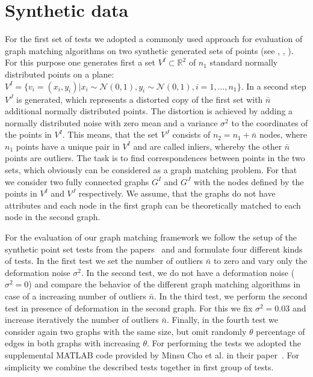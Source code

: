 \section{Synthetic data}
For the first set of tests we adopted a commonly used approach for evaluation of graph matching algorithms on two synthetic generated sets of points (see \cite{Cho2014_Haystack}, \cite{Cho2010_RRWM}, \cite{Leordeanu2009_IPFP}). 
For this purpose one generates first a set $V^I\subset\mathbb{R}^2$ of $n_1$ standard normally distributed points on a plane: $V^I=\{v_i=(x_i,y_i)|x_i\sim\mathcal{N}(0,1),y_i\sim\mathcal{N}(0,1),i=1,\dots,n_1\}$. In a second step $V^J$ is generated, which represents a distorted copy of the first set with $\bar{n}$ additional normally distributed points. The distortion is achieved by adding a normally distributed noise with zero mean and a variance $\sigma^2$ to the coordinates of the points in $V^I$. 
This means, that the set $V^J$ consists of $n_2=n_1+\bar{n}$ nodes, where $n_1$ points have a unique pair in $V^I$ and are called inliers, whereby the other $\bar{n}$ points are outliers. The task is to find correspondences between points in the two sets, which obviously can be considered as a graph matching problem. For that we consider two fully connected graphs $G^I$ and $G^J$ with the nodes defined by the points in $V^I$ and $V^J$ respectively. We assume, that the graphs do not have attributes and each node in the first graph can be theoretically matched to each node in the second graph.

For the evaluation of our graph matching framework we follow the setup of the synthetic point set tests from the papers~\cite{Cho2014_Haystack} and \cite{FastPFP} and formulate four different kinds of tests. In the first test we set the number of outliers $\bar{n}$ to zero and vary only the deformation noise $\sigma^2$. In the second test, we do not have a deformation noise ($\sigma^2=0$) and compare the behavior of the different graph matching algorithms in case of a increasing number of outliers $\bar{n}$. In the third test, we perform the second test in presence of deformation in the second graph. For this we fix $\sigma^2= 0.03$ and increase iteratively the number of outliers $\bar{n}$. Finally, in the fourth test we consider again two graphs with the same size, but omit randomly $\theta$ percentage of edges in both graphs with increasing $\theta$. 
For performing the tests we adopted the supplemental MATLAB code provided by Minsu Cho et al. in their paper~\cite{Cho2014_Haystack,code_MPM}. For simplicity we combine the described tests together in first group of tests. %

